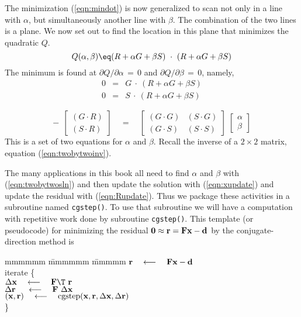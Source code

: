 \par
The minimization (\ref{eqn:mindot}) is now generalized
to scan not only in a line with $\alpha$,
but simultaneously another line with $\beta$.
The combination of the two lines is a plane.
We now set out to find the location in this plane that minimizes the quadratic $Q$.
\begin{equation}
Q(\alpha ,\beta ) \eq
( R + \alpha G + \beta S) \ \cdot\  (R + \alpha G + \beta S )
\label{eqn:cgqf}
\end{equation}
The minimum is found at  $\partial Q / \partial \alpha \,=\,0$  and
$\partial Q / \partial \beta \,=\,0$, namely,
\begin{eqnarray}
0 &=& G \ \cdot\  ( R + \alpha G + \beta S )
\\
0 &=& S \ \cdot\  ( R + \alpha G + \beta S )
\end{eqnarray}
\par
\begin{equation}
\label{eqn:twobytwosln}
-\ \ 
\left[ 
\begin{array}{c}
  (G\cdot R) \\
  (S\cdot R) \end{array} \right]
\quad = \quad
\left[ 
\begin{array}{rr}
   (G \cdot G) & (S \cdot G)  \\
   (G \cdot S) & (S \cdot S)  \end{array} \right] 
\;
\left[ 
\begin{array}{c}
  \alpha \\ 
  \beta \end{array} \right] 
\end{equation}
This is a set of two equations for $\alpha$ and $\beta$.
Recall the inverse of a $2\times 2$ matrix, equation (\ref{eqn:twobytwoinv}).
\par
The many applications in this book all need to
find $\alpha$ and $\beta$ with (\ref{eqn:twobytwosln}) and then
update the solution with (\ref{eqn:xupdate}) and
update the residual with (\ref{eqn:Rupdate}).
Thus we package these activities in a subroutine
named \texttt{cgstep()}.
To use that subroutine we will have a computation 
with
repetitive work done by subroutine {\tt cgstep()}.
This template (or pseudocode) for minimizing the residual
$\bold 0\approx \bold r = \bold F \bold x - \bold d$
by the conjugate-direction method is
\label{lsq/'cgtemplate'}
\begin{tabbing}
mmmmmm \= mmmmmm \= mmmmm \kill
\> $\bold r \quad\longleftarrow\quad \bold F \bold x - \bold d$                \\
\> {\rm iterate \{ }                                                    \\
\>      \>  $\Delta \bold x   \padarrow \bold F\T\         \bold r$      \\
\>      \>  $\Delta \bold r\  \quad\longleftarrow\quad \bold F \  \Delta \bold x$      \\
\>      \>  $(\bold x,\bold r) \quad\longleftarrow\quad {\rm cgstep}
             (\bold x,\bold r, \Delta\bold x,\Delta\bold r )$
        \\
\>      \> \}                                           
\end{tabbing}
